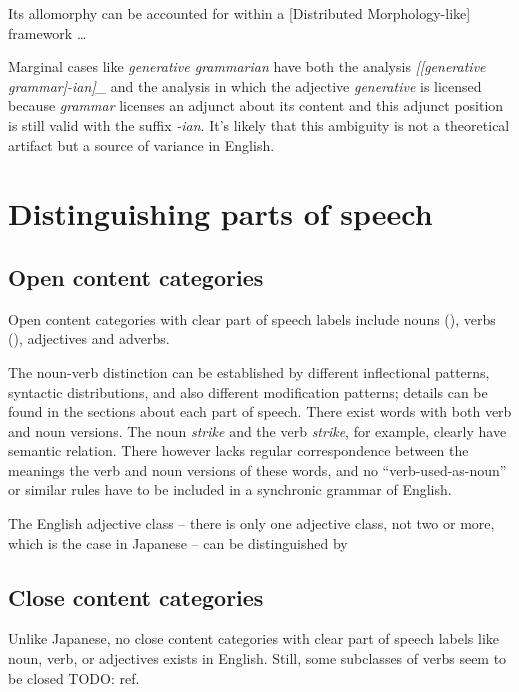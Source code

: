 \documentclass[UTF8, a4paper, oneside, scheme=plain, 12pt]{ctexbook}
\newcommand{\form}[1]{\emph{#1}}
\begin{document}
\begin{exe}
    \ex\label{ex:morphology.dephrasal.1} Its allomorphy can be accounted for within a [Distributed Morphology-like] framework \dots
\end{exe}

Marginal cases like \form{generative grammarian}
have both the analysis \form{[[generative grammar]-ian]_{}} 
and the analysis in which 
the adjective \form{generative} is licensed 
because \form{grammar} licenses an adjunct about its content 
and this adjunct position is still valid with the suffix \form{-ian}.
It's likely that 
this ambiguity is not a theoretical artifact 
but a source of variance in English.

\section{Distinguishing parts of speech}\label{sec:pos.find}

\subsection{Open content categories}

Open content categories with clear part of speech labels
include nouns (), 
verbs (), adjectives and adverbs.

The noun-verb distinction can be established by 
different inflectional patterns, syntactic distributions,
and also different modification patterns;
details can be found in the sections about each part of speech.
There exist words with both verb and noun versions.
The noun \form{strike} and the verb \form{strike}, for example,
clearly have semantic relation.
There however lacks regular correspondence between the meanings 
the verb and noun versions of these words, 
and no ``verb-used-as-noun'' or similar rules have to be included 
in a synchronic grammar of English.

The English adjective class -- there is only one adjective class, not two or more,
which is the case in Japanese -- 
can be distinguished by 

\subsection{Close content categories}

Unlike Japanese, no close content categories with clear part of speech labels 
like noun, verb, or adjectives exists in English.
Still, some subclasses of verbs seem to be closed TODO: ref.
\end{document}
